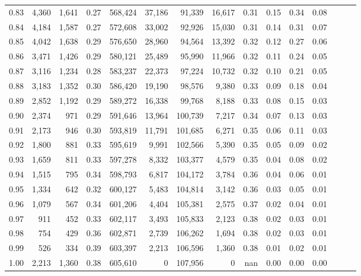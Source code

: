 \begin{tabular}{rrrrrrrrrrrrrrr}
0.83 &   4,360 &  1,641 &  0.27 &  568,424 &   37,186 &   91,339 &   16,617 &  0.31 &  0.15 &  0.34 &      0.08 \\
0.84 &   4,184 &  1,587 &  0.27 &  572,608 &   33,002 &   92,926 &   15,030 &  0.31 &  0.14 &  0.31 &      0.07 \\
0.85 &   4,042 &  1,638 &  0.29 &  576,650 &   28,960 &   94,564 &   13,392 &  0.32 &  0.12 &  0.27 &      0.06 \\
0.86 &   3,471 &  1,426 &  0.29 &  580,121 &   25,489 &   95,990 &   11,966 &  0.32 &  0.11 &  0.24 &      0.05 \\
0.87 &   3,116 &  1,234 &  0.28 &  583,237 &   22,373 &   97,224 &   10,732 &  0.32 &  0.10 &  0.21 &      0.05 \\
0.88 &   3,183 &  1,352 &  0.30 &  586,420 &   19,190 &   98,576 &    9,380 &  0.33 &  0.09 &  0.18 &      0.04 \\
0.89 &   2,852 &  1,192 &  0.29 &  589,272 &   16,338 &   99,768 &    8,188 &  0.33 &  0.08 &  0.15 &      0.03 \\
0.90 &   2,374 &    971 &  0.29 &  591,646 &   13,964 &  100,739 &    7,217 &  0.34 &  0.07 &  0.13 &      0.03 \\
0.91 &   2,173 &    946 &  0.30 &  593,819 &   11,791 &  101,685 &    6,271 &  0.35 &  0.06 &  0.11 &      0.03 \\
0.92 &   1,800 &    881 &  0.33 &  595,619 &    9,991 &  102,566 &    5,390 &  0.35 &  0.05 &  0.09 &      0.02 \\
0.93 &   1,659 &    811 &  0.33 &  597,278 &    8,332 &  103,377 &    4,579 &  0.35 &  0.04 &  0.08 &      0.02 \\
0.94 &   1,515 &    795 &  0.34 &  598,793 &    6,817 &  104,172 &    3,784 &  0.36 &  0.04 &  0.06 &      0.01 \\
0.95 &   1,334 &    642 &  0.32 &  600,127 &    5,483 &  104,814 &    3,142 &  0.36 &  0.03 &  0.05 &      0.01 \\
0.96 &   1,079 &    567 &  0.34 &  601,206 &    4,404 &  105,381 &    2,575 &  0.37 &  0.02 &  0.04 &      0.01 \\
0.97 &     911 &    452 &  0.33 &  602,117 &    3,493 &  105,833 &    2,123 &  0.38 &  0.02 &  0.03 &      0.01 \\
0.98 &     754 &    429 &  0.36 &  602,871 &    2,739 &  106,262 &    1,694 &  0.38 &  0.02 &  0.03 &      0.01 \\
0.99 &     526 &    334 &  0.39 &  603,397 &    2,213 &  106,596 &    1,360 &  0.38 &  0.01 &  0.02 &      0.01 \\
1.00 &   2,213 &  1,360 &  0.38 &  605,610 &        0 &  107,956 &        0 &   nan &  0.00 &  0.00 &      0.00 \\
\bottomrule
\end{tabular}
